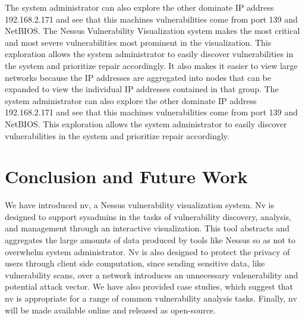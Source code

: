 \documentclass{acm_proc_article-sp}
\begin{document}
The system administrator can also explore the other dominate IP address 192.168.2.171 and
see that this machines vulnerabilities come from port 139 and NetBIOS. The
Nessus Vulnerability Visualization system makes the most critical and most
severe vulnerabilities most prominent in the visualization. This
exploration allows the system administrator to easily discover vulnerabilities
in the system and prioritize repair accordingly. It also makes it easier to view large
networks because the IP addresses are aggregated into nodes that can be expanded to view
the individual IP addresses contained in that group. The system administrator can also explore the other dominate IP address 192.168.2.171 and
see that this machines vulnerabilities come from port 139 and NetBIOS. This
exploration allows the system administrator to easily discover vulnerabilities
in the system and prioritize repair accordingly. 



\section{Conclusion and Future Work}

We have introduced nv, a Nessus vulnerability visualization system.
Nv is designed to support sysadmins in the tasks of vulnerability discovery, analysis, and management through an interactive visualization.
This tool abstracts and aggregates the large amounts of data produced by tools like Nessus so as not to overwhelm system administrator.
Nv is also designed to protect the privacy of users through client side computation, since sending sensitive data, like vulnerability scans, over a network introduces an unnecessary vulenerability and potential attack vector.
We have also provided case studies, which suggest that nv is appropriate for a range of common vulnerability analysis tasks.
Finally, nv will be made available online and released as open-source.





\end{document}
